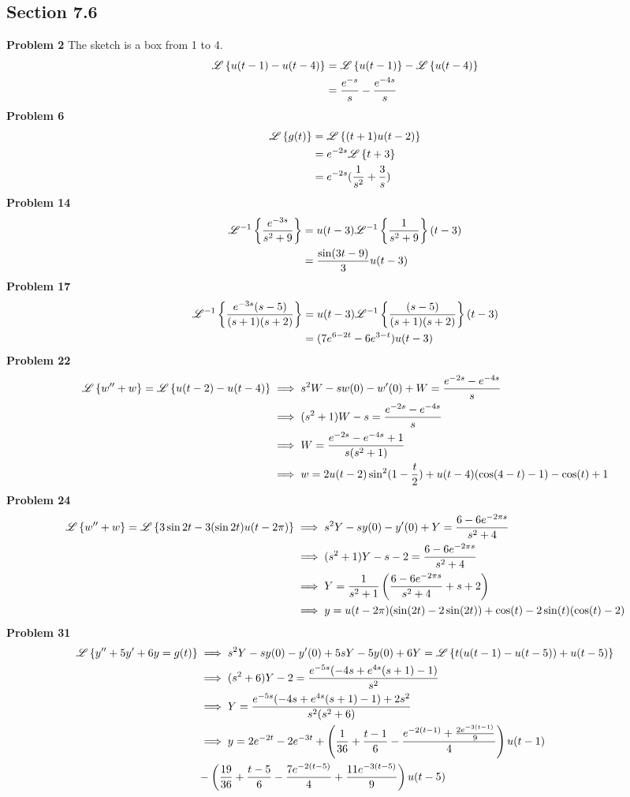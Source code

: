 \subsection*{Section 7.6}
\textbf{Problem 2}
The sketch is a box from 1 to 4.
\begin{align*}
    \mathscr{L} \left\{ u(t-1) - u(t-4) \right\}
    &= \mathscr{L} \left\{ u(t-1) \right\} - \mathscr{L} \left\{ u(t-4) \right\} \\
    &= \frac{e^{-s}}{s} - \frac{e^{-4s}}{s}
\end{align*}
\textbf{Problem 6}
\begin{align*}
    \mathscr{L} \left\{ g(t) \right\}
    &= \mathscr{L} \left\{ (t+1)u(t-2) \right\} \\
    &= e^{-2s}\mathscr{L} \left\{ t+3 \right\} \\
    &= e^{-2s}(\frac{1}{s^2} + \frac{3}{s}) 
\end{align*}
\textbf{Problem 14}
\begin{align*}
    \mathscr{L}^{-1} \left\{ \frac{e^{-3s}}{s^2+9} \right\}
    &= u(t-3) \mathscr{L}^{-1} \left\{ \frac{1}{s^2+9} \right\}(t-3) \\
    &= \frac{\sin(3t-9)}{3}u(t-3)
\end{align*}
\textbf{Problem 17}
\begin{align*}
    \mathscr{L}^{-1} \left\{ \frac{e^{-3s}(s-5)}{(s+1)(s+2)} \right\}
    &= u(t-3) \mathscr{L}^{-1} \left\{ \frac{(s-5)}{(s+1)(s+2)} \right\}(t-3) \\
    &= (7e^{6-2t}-6e^{3-t})u(t-3)
\end{align*}
\textbf{Problem 22}
\begin{align*}
    \mathscr{L} \left\{ w'' + w \right\} = \mathscr{L} \left\{ u(t-2) - u(t-4) \right\}
    &\implies s^2W - sw(0) - w'(0) + W= \frac{e^{-2s}-e^{-4s}}{s} \\
    &\implies (s^2 + 1)W - s = \frac{e^{-2s}-e^{-4s}}{s} \\
    &\implies W = \frac{e^{-2s}-e^{-4s} + 1}{s(s^2+1)} \\
    &\implies w = 2u(t-2)\sin^2(1-\frac{t}{2}) + u(t-4)(\cos(4-t)-1) - \cos(t) + 1
\end{align*}
\textbf{Problem 24}
\begin{align*}
    \mathscr{L} \left\{ w'' + w \right\} = \mathscr{L} \left\{ 3\sin 2t - 3(\sin 2t)u(t-2\pi) \right\}
    &\implies s^2Y - sy(0) - y'(0) + Y = \frac{6-6e^{-2\pi s}}{s^2+4} \\
    &\implies (s^2 + 1)Y - s - 2= \frac{6-6e^{-2\pi s}}{s^2+4} \\
    &\implies Y = \frac{1}{s^2 + 1}\left(\frac{6-6e^{-2\pi s}}{s^2+4} + s + 2\right)\\
    &\implies y = u(t-2\pi)(\sin(2t) -2\sin(2t))+\cos(t) - 2\sin(t)(\cos(t) - 2)
\end{align*}
\textbf{Problem 31}
\begin{align*}
    \mathscr{L} \left\{ y'' + 5y' + 6y = g(t) \right\}
    &\implies s^2Y - sy(0) - y'(0) + 5sY - 5y(0) + 6Y = \mathscr{L} \left\{ t(u(t-1)- u(t-5)) + u(t-5) \right\} \\
    &\implies (s^2+6)Y - 2 = \frac{e^{-5s}(-4s+e^{4s}(s+1)-1)}{s^2} \\
    &\implies Y = \frac{e^{-5s}(-4s+e^{4s}(s+1)-1)+2s^2}{s^2(s^2+6)} \\
    &\implies y = 2e^{-2t} - 2e^{-3t} + \left(\frac{1}{36} + \frac{t-1}{6}-\frac{e^{-2(t-1)} + \frac{2e^{-3(t-1)}}{9}}{4}\right)u(t-1) \\
        &- \left(\frac{19}{36} + \frac{t-5}{6} - \frac{7e^{-2(t-5)}}{4} + \frac{11e^{-3(t-5)}}{9}\right)u(t-5)
\end{align*}